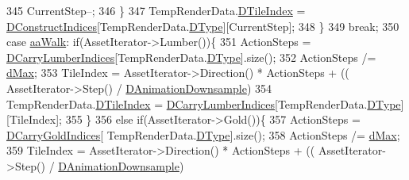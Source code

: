 \begin{DoxyCode}
{345                                                     CurrentStep--;   
346                                                 \}
347                                                 TempRenderData.\hyperlink{structSAssetRenderData_a8c97c7f34d5b359f6fa23ce215a09929}{DTileIndex} = 
      \hyperlink{classCAssetRenderer_a1790a8f6992efbb3fea59dde42a3cacb}{DConstructIndices}[TempRenderData.\hyperlink{structSAssetRenderData_ae986cfe9d4238fa31fb511b40392d97f}{DType}][CurrentStep];
348                                             \}
349                                             \textcolor{keywordflow}{break};
350                     \textcolor{keywordflow}{case} \hyperlink{GameDataTypes_8h_ab47668e651a3032cfb9c40ea2d60d670a60ca9010aa62b73c1aab838ff4bf7276}{aaWalk}:            \textcolor{keywordflow}{if}(AssetIterator->Lumber())\{
351                                                 ActionSteps = 
      \hyperlink{classCAssetRenderer_a986dc401334deb267cb772ff0650fcb6}{DCarryLumberIndices}[TempRenderData.\hyperlink{structSAssetRenderData_ae986cfe9d4238fa31fb511b40392d97f}{DType}].size();
352                                                 ActionSteps /= \hyperlink{GameDataTypes_8h_acb2b033915f6659a71a38b5aa6e4eb42af6546049275557ce0ade2ceee042a319}{dMax};
353                                                 TileIndex = AssetIterator->Direction() * ActionSteps + ((
      AssetIterator->Step() / \hyperlink{classCAssetRenderer_a13ea9a19837c39e57db499f53366c5b8}{DAnimationDownsample})%
354                                                 TempRenderData.\hyperlink{structSAssetRenderData_a8c97c7f34d5b359f6fa23ce215a09929}{DTileIndex} = 
      \hyperlink{classCAssetRenderer_a986dc401334deb267cb772ff0650fcb6}{DCarryLumberIndices}[TempRenderData.\hyperlink{structSAssetRenderData_ae986cfe9d4238fa31fb511b40392d97f}{DType}][TileIndex];
355                                             \}
356                                             \textcolor{keywordflow}{else} \textcolor{keywordflow}{if}(AssetIterator->Gold())\{
357                                                 ActionSteps = \hyperlink{classCAssetRenderer_aaf8c772b7d3fbe8c145282e5106749d6}{DCarryGoldIndices}[
      TempRenderData.\hyperlink{structSAssetRenderData_ae986cfe9d4238fa31fb511b40392d97f}{DType}].size();
358                                                 ActionSteps /= \hyperlink{GameDataTypes_8h_acb2b033915f6659a71a38b5aa6e4eb42af6546049275557ce0ade2ceee042a319}{dMax};
359                                                 TileIndex = AssetIterator->Direction() * ActionSteps + ((
      AssetIterator->Step() / \hyperlink{classCAssetRenderer_a13ea9a19837c39e57db499f53366c5b8}{DAnimationDownsample})%
}
\end{DoxyCode}
